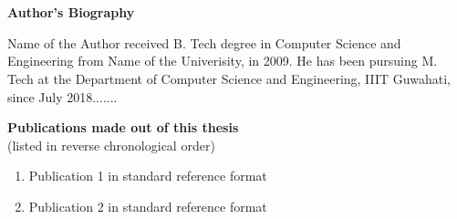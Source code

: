 \chapter*{}
 \begin{center}
 {\Huge \bfseries Author's Biography}
 \vspace{1cm}
 \end{center}
 
 \onehalfspace
 \noindent Name of the Author received B. Tech degree in Computer Science and Engineering from Name of the Univerisity, in 2009. He has been pursuing M. Tech at the Department of Computer Science and Engineering, IIIT Guwahati, since July 2018.......
 
 \singlespace
 \begin{center}
 \vspace{0.3cm}
 {\bfseries {\large Publications made out of this thesis\\}}
 (listed in reverse chronological order)
 \vspace{0.3cm}
 \end{center}
 
 \begin{enumerate}
\item Publication 1 in standard reference format
\item Publication 2 in standard reference format

 	  
 \end{enumerate}
